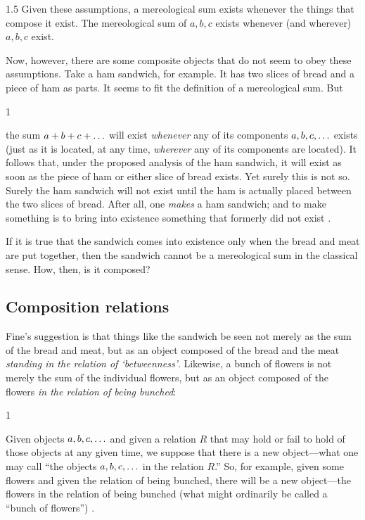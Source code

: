 \documentclass[11pt]{article}
\newenvironment{squote}{%
\begin{spacing}{1}
\begin{list}{}{%
\setlength{\labelwidth}{0pt}%
\rightmargin\leftmargin%
}
\item\relax
}{%
\end{list}%
\end{spacing}
}
\begin{document}
\begin{spacing}{1.5}
Given these assumptions, a mereological sum exists whenever the things
that compose it exist.  The mereological sum of $a, b, c$ exists
whenever (and wherever) $a, b, c$ exist.

Now, however, there are some composite objects that do not seem to
obey these assumptions.  Take a ham sandwich, for example.  It has two
slices of bread and a piece of ham as parts.  It seems to fit the
definition of a mereological sum.  But

\begin{squote}
the sum $a + b + c + \mathellipsis $ will exist {\em whenever} any of
its components $a, b, c, \mathellipsis $ exists (just as it is
located, at any time, {\em wherever} any of its components are
located).  It follows that, under the proposed analysis of the ham
sandwich, it will exist as soon as the piece of ham or either slice of
bread exists.  Yet surely this is not so.  Surely the ham sandwich
will not exist until the ham is actually placed between the two slices
of bread.  After all, one {\em makes} a ham sandwich; and to make
something is to bring into existence something that formerly did not
exist \citep[62]{fine1999}.
\end{squote}

If it is true that the sandwich comes into existence only when the
bread and meat are put together, then the sandwich cannot be a
mereological sum in the classical sense.  How, then, is it composed?

\subsection{Composition relations}
\label{rigid}
Fine's suggestion is that things like the sandwich be seen not merely
as the sum of the bread and meat, but as an object composed of the
bread and the meat {\em standing in the relation of `betweenness'}.
Likewise, a bunch of flowers is not merely the sum of the individual
flowers, but as an object composed of the flowers {\em in the relation
  of being bunched}:

\begin{squote}
Given objects $a, b, c, \mathellipsis $ and given a relation $R$ that
may hold or fail to hold of those objects at any given time, we
suppose that there is a new object---what one may call ``the objects
$a, b, c, \mathellipsis $ in the relation $R$.''  So, for example,
given some flowers and given the relation of being bunched, there will
be a new object---the flowers in the relation of being bunched (what
might ordinarily be called a ``bunch of flowers'')
\citeyearpar[65]{fine1999}.
\end{squote}


\end{spacing}
\end{document}
